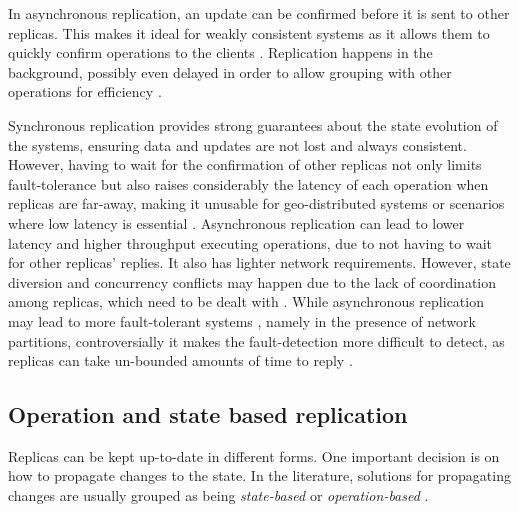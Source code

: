 
In asynchronous replication, an update can be confirmed before it is sent to other replicas.
This makes it ideal for weakly consistent systems as it allows them to quickly confirm operations to the clients \cite{cops}.
Replication happens in the background, possibly even delayed in order to allow grouping with other operations for efficiency \cite{dynamo}.


Synchronous replication provides strong guarantees about the state evolution of the systems, ensuring data and updates are not lost and always consistent.
However, having to wait for the confirmation of other replicas not only limits fault-tolerance \cite{spanner} but also raises considerably the latency of each operation when replicas are far-away, making it unusable for geo-distributed systems or scenarios where low latency is essential \cite{slog}.
Asynchronous replication can lead to lower latency and higher throughput executing operations, due to not having to wait for other replicas' replies.
It also has lighter network requirements.
However, state diversion and concurrency conflicts may happen due to the lack of coordination among replicas, which need to be dealt with \cite{dynamo}.
While asynchronous replication may lead to more fault-tolerant systems \cite{dynamo, cassandra, cops}, namely in the presence of network partitions, controversially it makes the fault-detection more difficult to detect, as replicas can take un-bounded amounts of time to reply \cite{cap}.


\subsection{Operation and state based replication}

Replicas can be kept up-to-date in different forms.
One important decision is on how to propagate changes to the state.
In the literature, solutions for propagating changes are usually grouped as being \emph{state-based} or \emph{operation-based} \cite{crdt}.

